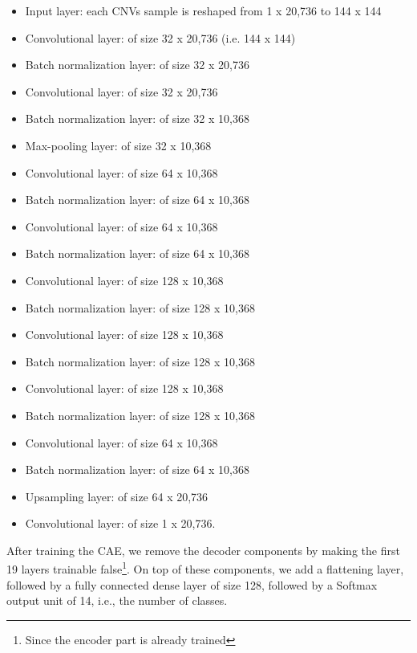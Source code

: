 \begin{itemize}[noitemsep]
        \item Input layer: each CNVs sample is reshaped from 1 x 20,736 to 144 x 144
        \item Convolutional layer: of size 32 x 20,736 (i.e. 144 x 144) 
        \item Batch normalization layer: of size 32 x 20,736
        \item Convolutional layer: of size 32 x 20,736
        \item Batch normalization layer: of size 32 x 10,368
        \item Max-pooling layer: of size 32 x 10,368
        \item Convolutional layer: of size 64 x 10,368
        \item Batch normalization layer: of size 64 x 10,368
        \item Convolutional layer: of size 64 x 10,368
        \item Batch normalization layer: of size 64 x 10,368
        \item Convolutional layer: of size 128 x 10,368
        \item Batch normalization layer: of size 128 x 10,368
        \item Convolutional layer: of size 128 x 10,368
        \item Batch normalization layer: of size 128 x 10,368
        \item Convolutional layer: of size 128 x 10,368
        \item Batch normalization layer: of size 128 x 10,368
        \item Convolutional layer: of size 64 x 10,368
        \item Batch normalization layer: of size 64 x 10,368
        \item Upsampling layer: of size 64 x 20,736 
        \item Convolutional layer: of size 1 x 20,736.
\end{itemize}

\hspace*{3.5mm} After training the CAE, we remove the decoder components by making the first 19 layers trainable false\footnote{Since the encoder part is already trained}. On top of these components, we add a flattening layer, followed by a fully connected dense layer of size 128, followed by a Softmax output unit of 14, i.e., the number of classes. 

